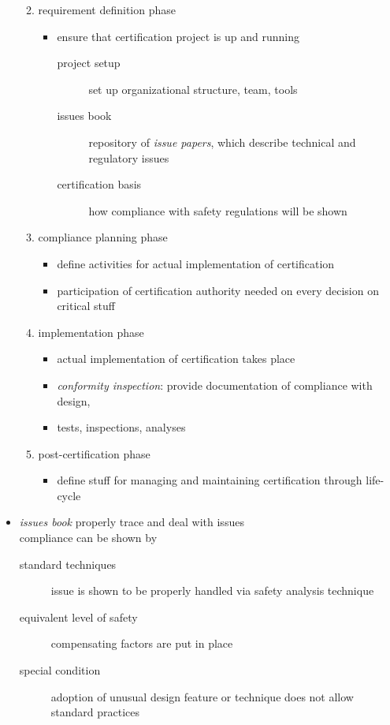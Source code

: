 \documentclass[a4paper, 10pt]{article}
\begin{document}
\begin{itemize}
\begin{enumerate}
\begin{itemize}
\begin{description}
            \end{description}
        \end{itemize}
        \item requirement definition phase
        \begin{itemize}
            \item ensure that certification project is up and running
            \begin{description}
                \item[project setup] set up organizational structure, team, tools
                \item[issues book] repository of \emph{issue papers}, which describe technical and regulatory issues
                \item[certification basis] how compliance with safety regulations will be shown
            \end{description}
        \end{itemize}
        \item compliance planning phase
        \begin{itemize}
            \item define activities for actual implementation of certification
            \item participation of certification authority needed on every decision on critical stuff
        \end{itemize}
        \item implementation phase
        \begin{itemize}
            \item actual implementation of certification takes place
            \item \emph{conformity inspection}: provide documentation of compliance with design,
            \item tests, inspections, analyses
        \end{itemize}
        \item post-certification phase
        \begin{itemize}
            \item define stuff for managing and maintaining certification through life-cycle
        \end{itemize}
    \end{enumerate}
    \item \emph{issues book} properly trace and deal with issues\\
    compliance can be shown by
    \begin{description}
        \item[standard techniques]  issue is shown to be properly handled via safety analysis technique
        \item[equivalent level of safety] compensating factors are put in place
        \item[special condition] adoption of unusual design feature or technique does not allow standard practices
    \end{description}
\end{itemize}
\end{document}
